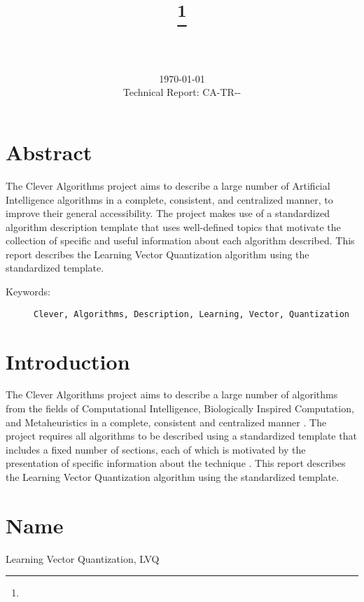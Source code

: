 \documentclass[a4paper, 11pt]{article}
\title{{\myreporttitle}\footnote{\myreportlicense}}
\author{\myreportauthor\\{\myreportemail}\\\small\myreportproject}
\date{\today\\{\small{Technical Report: CA-TR-{\myreportdate}-\myreportversion}}}
\begin{document}
\maketitle

\section*{Abstract} 
The Clever Algorithms project aims to describe a large number of Artificial Intelligence algorithms in a complete, consistent, and centralized manner, to improve their general accessibility. 
The project makes use of a standardized algorithm description template that uses well-defined topics that motivate the collection of specific and useful information about each algorithm described.
This report describes the Learning Vector Quantization algorithm using the standardized template.

\begin{description}
	\item[Keywords:] {\small\texttt{Clever, Algorithms, Description, Learning, Vector, Quantization}}
\end{description} 

\section{Introduction} 
\label{sec:intro}
The Clever Algorithms project aims to describe a large number of algorithms from the fields of Computational Intelligence, Biologically Inspired Computation, and Metaheuristics in a complete, consistent and centralized manner \cite{Brownlee2010}.
The project requires all algorithms to be described using a standardized template that includes a fixed number of sections, each of which is motivated by the presentation of specific information about the technique \cite{Brownlee2010a}.
This report describes the Learning Vector Quantization algorithm using the standardized template.

\section{Name} 
\label{sec:name}
Learning Vector Quantization, LVQ
\end{document}
